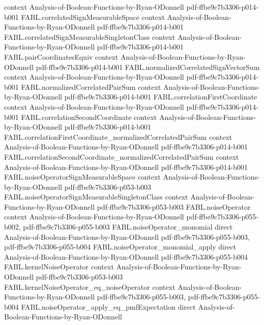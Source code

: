 \begin{theorem}
  {context}
  {Analysis-of-Boolean-Functions-by-Ryan-ODonnell}
  {pdf-ffbe9c7b3306-p014-b001}
\proofstep
  {FABL.correlatedSignMeasurableSpace}
  {context}
  {Analysis-of-Boolean-Functions-by-Ryan-ODonnell}
  {pdf-ffbe9c7b3306-p014-b001}
\proofstep
  {FABL.correlatedSignMeasurableSingletonClass}
  {context}
  {Analysis-of-Boolean-Functions-by-Ryan-ODonnell}
  {pdf-ffbe9c7b3306-p014-b001}
\proofstep
  {FABL.pairCoordinatesEquiv}
  {context}
  {Analysis-of-Boolean-Functions-by-Ryan-ODonnell}
  {pdf-ffbe9c7b3306-p014-b001}
\proofstep
  {FABL.normalizedCorrelatedSignVectorSum}
  {context}
  {Analysis-of-Boolean-Functions-by-Ryan-ODonnell}
  {pdf-ffbe9c7b3306-p014-b001}
\proofstep
  {FABL.normalizedCorrelatedPairSum}
  {context}
  {Analysis-of-Boolean-Functions-by-Ryan-ODonnell}
  {pdf-ffbe9c7b3306-p014-b001}
\proofstep
  {FABL.correlationFirstCoordinate}
  {context}
  {Analysis-of-Boolean-Functions-by-Ryan-ODonnell}
  {pdf-ffbe9c7b3306-p014-b001}
\proofstep
  {FABL.correlationSecondCoordinate}
  {context}
  {Analysis-of-Boolean-Functions-by-Ryan-ODonnell}
  {pdf-ffbe9c7b3306-p014-b001}
\proofstep
  {FABL.correlationFirstCoordinate_normalizedCorrelatedPairSum}
  {context}
  {Analysis-of-Boolean-Functions-by-Ryan-ODonnell}
  {pdf-ffbe9c7b3306-p014-b001}
\proofstep
  {FABL.correlationSecondCoordinate_normalizedCorrelatedPairSum}
  {context}
  {Analysis-of-Boolean-Functions-by-Ryan-ODonnell}
  {pdf-ffbe9c7b3306-p014-b001}
\proofstep
  {FABL.noiseOperatorSignMeasurableSpace}
  {context}
  {Analysis-of-Boolean-Functions-by-Ryan-ODonnell}
  {pdf-ffbe9c7b3306-p053-b003}
\proofstep
  {FABL.noiseOperatorSignMeasurableSingletonClass}
  {context}
  {Analysis-of-Boolean-Functions-by-Ryan-ODonnell}
  {pdf-ffbe9c7b3306-p053-b003}
\proofstep
  {FABL.noiseOperator}
  {context}
  {Analysis-of-Boolean-Functions-by-Ryan-ODonnell}
  {pdf-ffbe9c7b3306-p055-b002,
    pdf-ffbe9c7b3306-p055-b003}
\proofstep
  {FABL.noiseOperator_monomial}
  {direct}
  {Analysis-of-Boolean-Functions-by-Ryan-ODonnell}
  {pdf-ffbe9c7b3306-p055-b003,
    pdf-ffbe9c7b3306-p055-b004}
\proofstep
  {FABL.noiseOperator_monomial_apply}
  {direct}
  {Analysis-of-Boolean-Functions-by-Ryan-ODonnell}
  {pdf-ffbe9c7b3306-p055-b004}
\proofstep
  {FABL.kernelNoiseOperator}
  {context}
  {Analysis-of-Boolean-Functions-by-Ryan-ODonnell}
  {pdf-ffbe9c7b3306-p053-b003}
\proofstep
  {FABL.kernelNoiseOperator_eq_noiseOperator}
  {context}
  {Analysis-of-Boolean-Functions-by-Ryan-ODonnell}
  {pdf-ffbe9c7b3306-p055-b003,
    pdf-ffbe9c7b3306-p055-b004}
\proofstep
  {FABL.noiseOperator_apply_eq_pmfExpectation}
  {direct}
  {Analysis-of-Boolean-Functions-by-Ryan-ODonnell}

\end{theorem}

